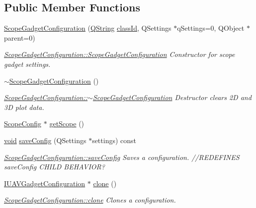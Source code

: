 \subsection*{\-Public \-Member \-Functions}
\begin{DoxyCompactItemize}
\item 
\hyperlink{group___scope_plugin_ga08c3c3b7c00b5fca9d78f97f6ae66381}{\-Scope\-Gadget\-Configuration} (\hyperlink{group___u_a_v_objects_plugin_gab9d252f49c333c94a72f97ce3105a32d}{\-Q\-String} \hyperlink{group___core_plugin_gac953657221ba7fda967ada0408332641}{class\-Id}, \-Q\-Settings $\ast$q\-Settings=0, \-Q\-Object $\ast$parent=0)
\begin{DoxyCompactList}\small\item\em \hyperlink{group___scope_plugin_ga08c3c3b7c00b5fca9d78f97f6ae66381}{\-Scope\-Gadget\-Configuration\-::\-Scope\-Gadget\-Configuration} \-Constructor for scope gadget settings. \end{DoxyCompactList}\item 
\hyperlink{group___scope_plugin_ga3a4bf5369afe5c90183e5de5b9a64c99}{$\sim$\-Scope\-Gadget\-Configuration} ()
\begin{DoxyCompactList}\small\item\em \hyperlink{group___scope_plugin_ga3a4bf5369afe5c90183e5de5b9a64c99}{\-Scope\-Gadget\-Configuration\-::$\sim$\-Scope\-Gadget\-Configuration} \-Destructor clears 2\-D and 3\-D plot data. \end{DoxyCompactList}\item 
\hyperlink{class_scope_config}{\-Scope\-Config} $\ast$ \hyperlink{group___scope_plugin_gad77c6650f45b62d917a93db28ddbcc56}{get\-Scope} ()
\item 
\hyperlink{group___u_a_v_objects_plugin_ga444cf2ff3f0ecbe028adce838d373f5c}{void} \hyperlink{group___scope_plugin_ga1019b17dbc40bb39cb4deb12fe85912e}{save\-Config} (\-Q\-Settings $\ast$settings) const 
\begin{DoxyCompactList}\small\item\em \hyperlink{group___scope_plugin_ga1019b17dbc40bb39cb4deb12fe85912e}{\-Scope\-Gadget\-Configuration\-::save\-Config} \-Saves a configuration. //\-R\-E\-D\-E\-F\-I\-N\-E\-S save\-Config \-C\-H\-I\-L\-D \-B\-E\-H\-A\-V\-I\-O\-R? \end{DoxyCompactList}\item 
\hyperlink{group___core_plugin_gacdfdf0b1e39b5002472b76b6564ce51f}{\-I\-U\-A\-V\-Gadget\-Configuration} $\ast$ \hyperlink{group___scope_plugin_ga85df073ffa0cd27035a937df7c2cff8e}{clone} ()
\begin{DoxyCompactList}\small\item\em \hyperlink{group___scope_plugin_ga85df073ffa0cd27035a937df7c2cff8e}{\-Scope\-Gadget\-Configuration\-::clone} \-Clones a configuration. \end{DoxyCompactList}\item 

\end{DoxyCompactItemize}
